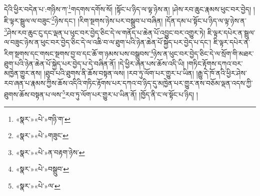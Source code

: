 དེའི་ཕྱིར་བདེན་པ་:གཉིས་ཀ་\footnote{«སྣར་»«པེ་»གཉི་ག་}གདགས་དགོས་སོ། །སྟོང་པ་ཉིད་ལ་ལྟ་ཉེས་ན། །ཤེས་རབ་ཆུང་རྣམས་ཕུང་བར་བྱེད། །ཇི་ལྟར་སྦྲུལ་ལ་བཟུང་\footnote{«སྣར་»«པེ་»གཟུང་}ཉེས་དང་། །རིག་སྔགས་ཉེས་པར་བསྒྲུབ་པ་བཞིན། །དོན་དམ་པ་སྟོང་པ་ཉིད་ལ་ལྟ་ཉེས་ན་\footnote{«སྣར་»«པེ་»ན་བརྟག་ཉེས་}ཤེས་རབ་ཆུང་ངུ་དང་ལྡན་པ་ཕུང་བར་བྱེད་ཅིང་དེ་ལ་གནོད་པ་ཆེན་པོ་འབྱུང་བར་འགྱུར་ཏེ། ཇི་ལྟར་དཔེར་ན་སྦྲུལ་ལ་བཟུང་ཉེས་ན་ཕུང་བར་བྱེད་ཅིང་དེ་ལ་འཆི་བ་ལ་ཐུག་པའི་ཉེན་ཆེན་པོ་སྐྱེད་པར་བྱེད་པ་དང་། ཇི་ལྟར་དཔེར་ན་རིག་སྔགས་དང་གསང་སྔགས་བྱ་བ་དང་ཆོ་ག་ཉམས་པས་བསྒྲུབས་\footnote{«སྣར་»«པེ་»བསྒྲུབ་}ཉེས་ན་ཕུང་བར་བྱེད་ཅིང་དེ་ལ་སྲོག་གི་མཐར་ཐུག་པའི་ཉེན་ཆེན་པོ་སྐྱེད་པར་བྱེད་པ་དེ་བཞིན་ནོ། །དེ་ཕྱིར་ཞན་པས་ཆོས་འདི་ཡི། །གཏིང་རྟོགས་དཀའ་བར་མཁྱེན་གྱུར་ནས། །ཐུབ་པའི་ཐུགས་ནི་ཆོས་བསྟན་ལས། །རབ་ཏུ་ལོག་པར་གྱུར་པ་ཡིན། །རྒྱུ་དེ་ཁོ་ནའི་ཕྱིར་ཤེས་རབ་ཞན་པ་རྣམས་ཀྱིས་ཆོས་འདིའི་གཏིང་རྟོགས་པར་དཀའ་བ་ཉིད་དུ་མཁྱེན་པར་གྱུར་ནས་བཅོམ་ལྡན་འདས་ཀྱི་ཐུགས་ཆོས་བསྟན་པ་ལས་\footnote{«སྣར་»«པེ་»ལ་}རབ་ཏུ་ལོག་པར་གྱུར་པ་ཡིན་ནོ། །ཁྱོད་ནི་ང་ལ་སྟོང་པ་ཉིད། །
